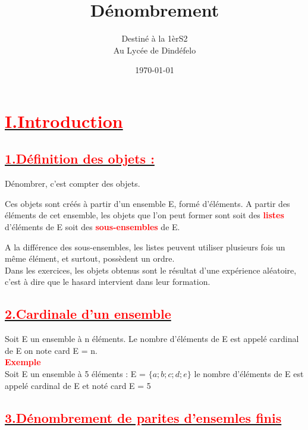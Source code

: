 \documentclass[12pt]{article}
\author{Destiné à la 1èrS2\\Au Lycée de Dindéfelo}
\title{\textbf{Dénombrement}}
\date{\today}
\begin{document}
\maketitle
\newpage
\section*{\underline{\textbf{\textcolor{red}{I.Introduction}}}}
\subsection*{\underline{\textbf{\textcolor{red}{1.Définition des objets :}}}}
Dénombrer, c’est compter des objets.

Ces objets sont créés à partir d’un ensemble E, formé d’éléments.
A partir des éléments de cet ensemble, les objets que l’on peut former sont soit des 
\textbf{\textcolor{red}{listes}}
d’éléments de E soit des \textbf{\textcolor{red}{sous-ensembles}} de E.

A la différence des sous-ensembles,
les listes peuvent utiliser plusieurs fois un même élément, et surtout, possèdent un ordre.\\
Dans les exercices, les objets obtenus sont le résultat d’une expérience aléatoire, c’est à dire que le hasard intervient dans leur formation.\\


\subsection*{\underline{\textbf{\textcolor{red}{2.Cardinale d'un ensemble}}}}
Soit E un ensemble à n éléments.
Le nombre d’éléments de E est appelé cardinal de E on note card E = n.\\
\textbf{\textcolor{red}{Exemple}}\\
Soit E un ensemble à 5 éléments : E = $\lbrace a ; b ; c ; d ; e \rbrace$
le nombre d’éléments de E est appelé cardinal de E et noté card E = 5
\subsection*{\underline{\textbf{\textcolor{red}{3.Dénombrement de parites d'ensemles finis}}}}
\end{document}
